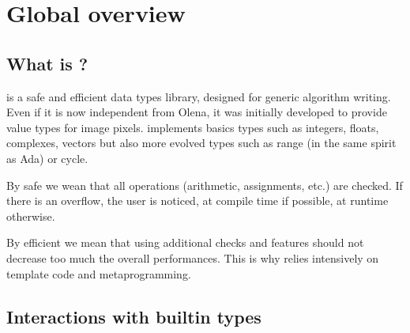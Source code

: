 % 
% 
% 
% 
% 


\section{Global overview}

\subsection{What is {\integre} ?}

{\integre} is a safe and efficient data types library, designed for
generic algorithm writing. Even if it is now independent from Olena,
it was initially developed to provide value types for image pixels.
{\integre} implements basics types such as integers, floats,
complexes, vectors but also more evolved types such as range (in the
same spirit as Ada) or cycle.

By safe we wean that all operations (arithmetic, assignments, etc.)
are checked. If there is an overflow, the user is noticed, at compile
time if possible, at runtime otherwise.

By efficient we mean that using {\integre} additional checks and
features should not decrease too much the overall performances. This
is why {\integre} relies intensively on template code and
metaprogramming.

\subsection{Interactions with builtin types}

